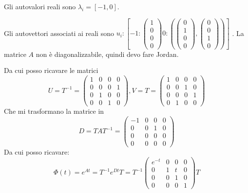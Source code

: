 \documentclass{article}
\begin{document}
Gli autovalori reali sono $\lambda_i = [-1, 0]$.

Gli autovettori associati ai reali sono $ u_i: [  -1: \left(\begin{matrix}1\\0\\0\\0\end{matrix}\right)0: (\left(\begin{matrix}0\\1\\0\\0\end{matrix}\right), \left(\begin{matrix}0\\0\\1\\0\end{matrix}\right)) ]$
.
La matrice $A$ non è diagonalizzabile, quindi devo fare Jordan.

Da cui posso ricavare le matrici \[U=T^{-1} = \left(\begin{matrix}1 & 0 & 0 & 0\\0 & 0 & 0 & 1\\0 & 1 & 0 & 0\\0 & 0 & 1 & 0\end{matrix}\right), V = T = \left(\begin{matrix}1 & 0 & 0 & 0\\0 & 0 & 1 & 0\\0 & 0 & 0 & 1\\0 & 1 & 0 & 0\end{matrix}\right)\]
Che mi trasformano la matrice in \[ D = TAT^{-1} = \left(\begin{matrix}-1 & 0 & 0 & 0\\0 & 0 & 1 & 0\\0 & 0 & 0 & 0\\0 & 0 & 0 & 0\end{matrix}\right) \]
Da cui posso ricavare: \[ \Phi(t) = e^{At} = T^{-1} e^{Dt} T =  T^{-1} \left(\begin{matrix}e^{- t} & 0 & 0 & 0\\0 & 1 & t & 0\\0 & 0 & 1 & 0\\0 & 0 & 0 & 1\end{matrix}\right) T\]
\end{document}
